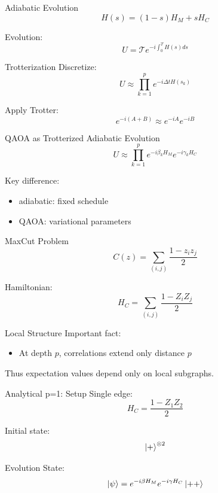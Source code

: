 \documentclass{beamer}
\begin{document}
\begin{frame}{Adiabatic Evolution}
\[
H(s) = (1-s)H_M + s H_C
\]

Evolution:
\[
U = \mathcal{T} e^{-i\int_0^T H(s)ds}
\]
\end{frame}

\begin{frame}{Trotterization}
Discretize:
\[
U \approx \prod_{k=1}^p e^{-i\Delta t H(s_k)}
\]

Apply Trotter:
\[
e^{-i(A+B)} \approx e^{-iA} e^{-iB}
\]
\end{frame}

\begin{frame}{QAOA as Trotterized Adiabatic Evolution}
\[
\boxed{
U \approx \prod_{k=1}^p e^{-i\beta_k H_M} e^{-i\gamma_k H_C}
}
\]

Key difference:
\begin{itemize}
\item adiabatic: fixed schedule
\item QAOA: variational parameters
\end{itemize}
\end{frame}

\begin{frame}{MaxCut Problem}
\[
C(z)=\sum_{(i,j)} \frac{1-z_i z_j}{2}
\]

Hamiltonian:
\[
H_C = \sum_{(i,j)} \frac{1-Z_i Z_j}{2}
\]
\end{frame}

\begin{frame}{Local Structure}
Important fact:
\begin{itemize}
\item At depth $p$, correlations extend only distance $p$
\end{itemize}

Thus expectation values depend only on local subgraphs.
\end{frame}

\begin{frame}{Analytical p=1: Setup}
Single edge:
\[
H_C = \frac{1-Z_1Z_2}{2}
\]

Initial state:
\[
\ket{+}^{\otimes 2}
\]
\end{frame}

\begin{frame}{Evolution}
State:
\[
\ket{\psi} = e^{-i\beta H_M} e^{-i\gamma H_C} \ket{++}
\]
\end{frame}
\end{document}
